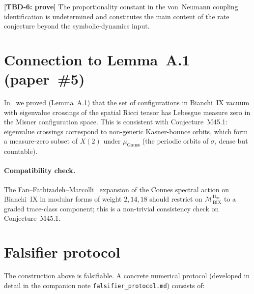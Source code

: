 \documentclass[12pt,a4paper]{article}
\begin{document}
\noindent\textbf{[TBD-6: prove]} The proportionality constant in the
von~Neumann coupling identification is undetermined and constitutes
the main content of the rate conjecture beyond the symbolic-dynamics
input.

\section{Connection to Lemma~A.1 (paper~\#5)}\label{sec:lemma}

In~\cite{ECI-paper5} we proved (Lemma~A.1) that the set of
configurations in Bianchi~IX vacuum with eigenvalue crossings of the
spatial Ricci tensor has Lebesgue measure zero in the Misner
configuration space.
This is consistent with Conjecture~M45.1: eigenvalue crossings
correspond to non-generic Kasner-bounce orbits, which form a
measure-zero subset of $X(2)$ under $\mu_{\mathrm{Gauss}}$ (the
periodic orbits of $\sigma$, dense but countable).

\paragraph{Compatibility check.}
The Fan--Fathizadeh--Marcolli~\cite{FFM2015} expansion of the
Connes spectral action on Bianchi~IX in modular forms of weight
$2,14,18$ should restrict on
$\mathcal{M}_{\mathrm{BIX}}^{\mathrm{II}_\infty}$ to a graded
trace-class component; this is a non-trivial consistency check on
Conjecture~M45.1.

\section{Falsifier protocol}\label{sec:falsifier}

The construction above is falsifiable.
A concrete numerical protocol (developed in detail in the companion
note \texttt{falsifier\_protocol.md}) consists of:
\end{document}
